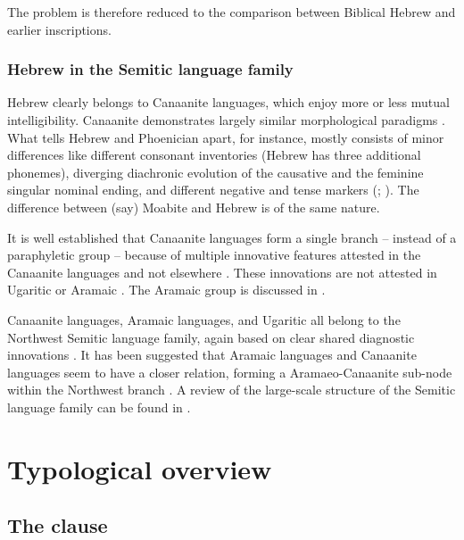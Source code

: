 \documentclass[a4paper, oneside, 12pt]{report}
\newcommand*{\citechap}[1]{Ch~{#1}}
\newcommand*{\citepage}[1]{p.~{#1}}
\newcommand*{\citepages}[1]{pp.~{#1}}
\begin{document}
The problem is therefore reduced to the comparison between Biblical Hebrew and earlier inscriptions.

\subsection{Hebrew in the Semitic language family}

Hebrew clearly belongs to Canaanite languages,
which enjoy more or less mutual intelligibility.
Canaanite demonstrates largely similar morphological paradigms
\citep[\citepages{515-524}]{pat2019semitic}.
What tells Hebrew and Phoenician apart, for instance, mostly consists of minor differences like different consonant inventories (Hebrew has three additional phonemes),
diverging diachronic evolution of the causative and the feminine singular nominal ending,
and different negative and tense markers (\citealt[\citepages{71-76}]{khan2013encyclopedia3}; \citealt[\citepage{513}]{pat2019semitic}).
The difference between (say) Moabite and Hebrew \citep[\citepage{430}]{khan2011semitic} is of the same nature.

It is well established that Canaanite languages form a single branch -- instead of a paraphyletic group --
because of multiple innovative features attested in the Canaanite languages and not elsewhere \citep[\citepages{12,510}]{pat2019semitic}.
These innovations are not attested in Ugaritic or Aramaic \citep[\citepage{460-462,510}]{pat2019semitic}.
The Aramaic group is discussed in \citet{huehnergard1995aramaic}.

Canaanite languages, Aramaic languages, and Ugaritic all belong to the Northwest Semitic language family,
again based on clear shared diagnostic innovations \citep[\citepages{11-13}]{pat2019semitic}.
It has been suggested that Aramaic languages and Canaanite languages seem to have a closer relation, forming a Aramaeo-Canaanite sub-node within the Northwest branch \citep[\citepage{12}]{pat2019semitic}.
A review of the large-scale structure of the Semitic language family can be found in \citet[\citechap{1}]{pat2019semitic}.

\chapter{Typological overview}

\section{The clause}
\end{document}
